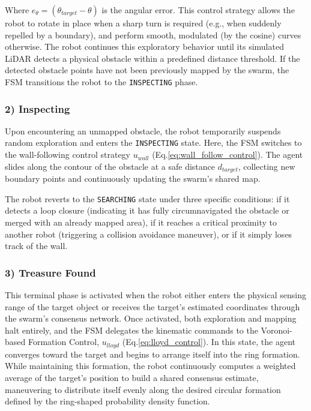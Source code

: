 \documentclass[times, twoside]{zHenriquesLab-StyleBioRxiv}
\begin{document}
Where $e_\theta = (\theta_{target} - \theta)$ is the angular error.
This control strategy allows the robot to rotate in place when a sharp turn is required (e.g., when suddenly repelled by a boundary), and perform smooth, modulated (by the cosine) curves otherwise. The robot continues this exploratory behavior until its simulated LiDAR detects a physical obstacle within a predefined distance threshold. If the detected obstacle points have not been previously mapped by the swarm, the FSM transitions the robot to the \texttt{INSPECTING} phase.

\subsubsection*{2) Inspecting}
Upon encountering an unmapped obstacle, the robot temporarily suspends random exploration and enters the \texttt{INSPECTING} state. Here, the FSM switches to the wall-following control strategy $u_{wall}$ (Eq.\ref{eq:wall_follow_control}). The agent slides along the contour of the obstacle at a safe distance $d_{target}$, collecting new boundary points and continuously updating the swarm's shared map. 


The robot reverts to the \texttt{SEARCHING} state under three specific conditions: if it detects a loop closure (indicating it has fully circumnavigated the obstacle or merged with an already mapped area), if it reaches a critical proximity to another robot (triggering a collision avoidance maneuver), or if it simply loses track of the wall.

\subsubsection*{3) Treasure Found}
This terminal phase is activated when the robot either enters the physical sensing range of the target object or receives the target's estimated coordinates through the swarm's consensus network. Once activated, both exploration and mapping halt entirely, and the FSM delegates the kinematic commands to the Voronoi-based Formation Control, $u_{lloyd}$ (Eq.\ref{eq:lloyd_control}). In this state, the agent converges toward the target and begins to arrange itself into the ring formation. While maintaining this formation, the robot continuously computes a weighted average of the target's position to build a shared consensus estimate, maneuvering to distribute itself evenly along the desired circular formation defined by the ring-shaped probability density function.
\end{document}

